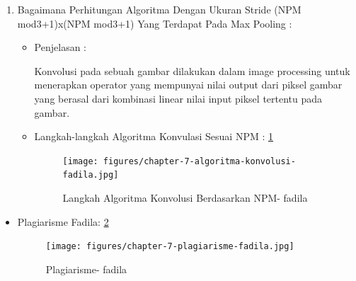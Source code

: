 \begin{enumerate}
\item Bagaimana Perhitungan Algoritma Dengan Ukuran Stride (NPM mod3+1)x(NPM mod3+1) Yang  Terdapat Pada Max Pooling :
\begin{itemize}
\item Penjelasan :
\par Konvolusi pada sebuah gambar dilakukan dalam image processing untuk menerapkan operator yang mempunyai nilai output dari piksel gambar yang berasal dari kombinasi linear nilai input piksel tertentu pada gambar.
\par
\item Langkah-langkah Algoritma Konvulasi Sesuai NPM : \ref{chapter-7-algoritma-konvolusi-fadila}
\par
\par
\begin{figure}[!hbtp]
\centering
\texttt{[image: figures/chapter-7-algoritma-konvolusi-fadila.jpg]}
\caption{Langkah Algoritma Konvolusi Berdasarkan NPM- fadila}
\label{chapter-7-algoritma-konvolusi-fadila}
\end{figure}
\par
\par
\end{itemize}
\end{enumerate}

\begin{itemize}
\item  Plagiarisme Fadila: \ref{chapter-7-plagiarisme-fadila}
\par
\begin{figure}[!hbtp]
\centering
\texttt{[image: figures/chapter-7-plagiarisme-fadila.jpg]}
\caption{Plagiarisme- fadila}
\label{chapter-7-plagiarisme-fadila}
\end{figure}
\par
\par
\end{itemize}


\par
\par
\par
\par
